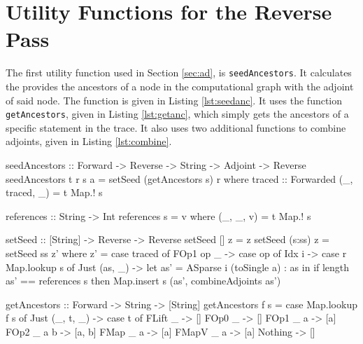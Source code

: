 \section{Utility Functions for the Reverse Pass} \label{app:utility}
    The first utility function used in Section \ref{sec:ad}, is \texttt{seedAncestors}.
    It calculates the provides the ancestors of a node in the computational graph with the adjoint of said node.
    The function is given in Listing \ref{lst:seedanc}.
    It uses the function \texttt{getAncestors}, given in Listing \ref{lst:getanc}, which simply gets the ancestors of a specific statement in the trace.
    It also uses two additional functions to combine adjoints, given in Listing \ref{lst:combine}.

    \begin{haskell}[caption=Function for seeding ancestors of a node, label=lst:seedanc, gobble=8]
        seedAncestors :: Forward -> Reverse -> String -> Adjoint -> Reverse
        seedAncestors t r s a = setSeed (getAncestors s) r
            where
                traced :: Forwarded
                (_, traced, _) = t Map.! s

                references :: String -> Int
                references s = v
                    where (_, _, v) = t Map.! s

                setSeed :: [String] -> Reverse -> Reverse
                setSeed []     z = z
                setSeed (s:ss) z = setSeed ss z'
                    where z' = case traced of
                        FOp1 op _ -> case op of
                            Idx i -> case r Map.lookup s of
                                Just (as, _) ->
                                    let as' = ASparse i (toSingle a) : as
                                    in  if   length as' == references s
                                        then Map.insert s (as', combineAdjoints as')
    \end{haskell}

    \begin{haskell}[caption=Function to get ancestors from a node in the trace, label=lst:getanc, gobble=8]
        getAncestors :: Forward -> String -> [String]
        getAncestors f s = case Map.lookup f s of
            Just (_, t, _) -> case t of
                FLift _     -> []
                FOp0  _     -> []
                FOp1  _ a   -> [a]
                FOp2  _ a b -> [a, b]
                FMap  _ a   -> [a]
                FMapV _ a   -> [a]
            Nothing        -> []
    \end{haskell}

